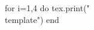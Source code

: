 \documentclass[twoside, 10pt]{article}
\title{}
\date{}
\newcommand{\template}{
\directlua{tex.print(utils.genVersion())}
\noindent
{\large
First Name \rule{6em}{.1pt}\hspace{\stretch{1}} Last Name \rule{6em}{.1pt}\hspace{\stretch{1}} Date \rule{1.5em}{.1pt} -- \rule{1.5em}{.1pt} -- \rule{1.5em}{.1pt}\hspace{\stretch{1}} Period \rule{2em}{.1pt}\hspace{\stretch{1}} Score \rule{2em}{.1pt}
}
\vspace{1em}
\begin{enumerate}
\item ({\textbf{Be Precise}}) Score: \rule{2em}{.4pt} 
\begin{enumerate}
\item
Find the value of the following expressions
\begin{enumerate}
\item
\directlua{b = utils.genRandom(2,5, false, false, false); e = utils.genRandom(-3, 3, false, false,false)}
$\log_\directlua{tex.print(b)}\left(\directlua{tex.print(utils.printFraction(b,e))}\right)$
\vspace{\stretch{1}}
\item
\directlua{b = utils.genRandom(2,9, false, false, false); e = utils.genRandom(-5, 5, false, false,false); c = utils.genRandom(2,9, false, false, false)}
$\directlua{tex.print(b)}^{\log_\directlua{tex.print(b)}\left(\directlua{tex.print(utils.printFraction(c,e))}\right)}$
\vspace{\stretch{1}}
\end{enumerate}
\item
In our information-rich era, knowledge is no longer scarce. The more valuable skill is knowing how to verify information. For instance, if you ask ChatGPT, “What is a solution to an equation?”, it will generate the following response.

A \textbf{solution to an equation} is a value (or set of values) that makes the equation \textbf{true} when substituted into it.

An equation states that two expressions are equal.  
A solution is the number (or numbers) that make both sides equal.

\subsection*{Example 1}

\[
x + 3 = 7
\]

Substitute \( x = 4 \):

\[
4 + 3 = 7
\]

Since this statement is true, \( 4 \) is a solution.

\subsection*{Example 2}

\[
x^2 = 9
\]

Two numbers satisfy this equation:

\[
3^2 = 9
\]

\[
(-3)^2 = 9
\]

So the solutions are \( x = 3 \) and \( x = -3 \).

\subsection*{Key Idea}

A solution must make the equation true when substituted in.  
Not every number is a solution --- only those that make the statement correct.

\textbf{Here is the question for you:}
\begin{enumerate}
\item
Is $x = 2$ a solution of $(x-3)(x+2) - 8 = -8$? Explain.
\vspace{\stretch{1}}
\item Find all solutions of  $(x-3)(x+2) - 8 = -8$.
\vspace{\stretch{1}}
\end{enumerate}
\clearpage
\end{enumerate}
\item ({\textbf{Argue}}) Score: \rule{2em}{.4pt} 
\begin{enumerate}
\item
Solve the equation system
\directlua{l = utils.genRandom(-9,9, false, false); m = utils.genRandom(-9,9, false, false, -l)}
\begin{align*}
y &=  \directlua{tex.print(utils.normalizeCoeff(-l - m, false, true))}x\\
y & = x^2\directlua{tex.print(utils.normalizeCoeff(l * m, true, true))}
\end{align*}
\vspace{\stretch{1}}
\item 
\directlua{l = utils.genRandom(-9,9, false, false); m = utils.genRandom(-9,9, false, false, -l)}
Solve the equation for $x$:
\[
(\ln x)^2 \directlua{tex.print(utils.normalizeCoeff(l + m, true, true))}\ln x \directlua{tex.print(utils.normalizeCoeff(l * m, true, true))} = 0
\]
\vspace{\stretch{1}}
\end{enumerate}
\end{enumerate}
\clearpage
}
\begin{document}
\begin{luacode}
for i=1,4 do
	tex.print("\\template")
end
\end{luacode}
\end{document}
